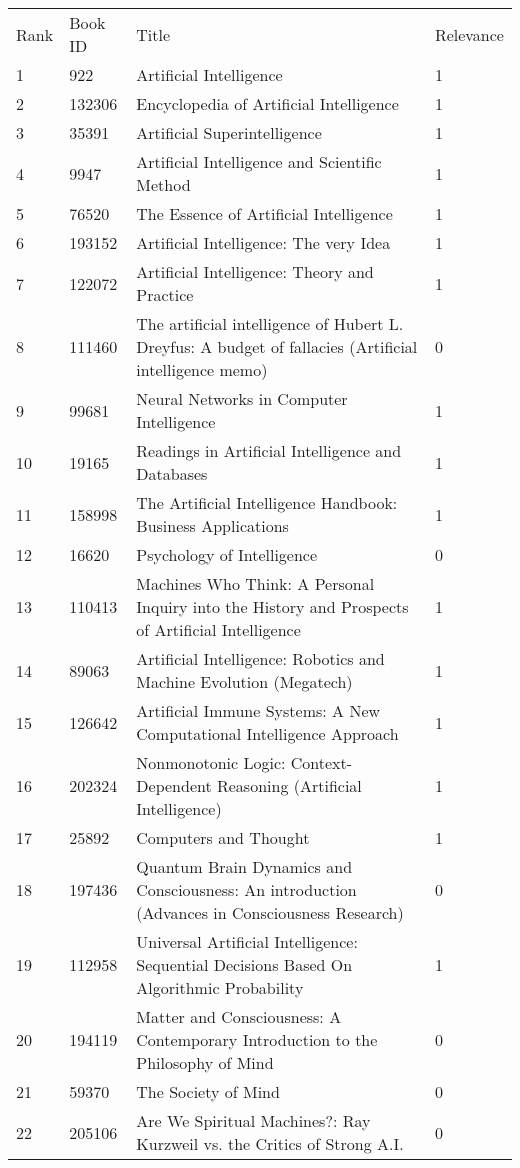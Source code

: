 \begin{tabular}{llll}
\toprule
\midrule
Rank & Book ID & Title & Relevance \\
1 & 922 & Artificial Intelligence & 1 \\
2 & 132306 & Encyclopedia of Artificial Intelligence & 1 \\
3 & 35391 & Artificial Superintelligence & 1 \\
4 & 9947 & Artificial Intelligence and Scientific Method & 1 \\
5 & 76520 & The Essence of Artificial Intelligence & 1 \\
6 & 193152 & Artificial Intelligence: The very Idea & 1 \\
7 & 122072 & Artificial Intelligence: Theory and Practice & 1 \\
8 & 111460 & The artificial intelligence of Hubert L. Dreyfus: A budget of fallacies (Artificial intelligence memo) & 0 \\
9 & 99681 & Neural Networks in Computer Intelligence & 1 \\
10 & 19165 & Readings in Artificial Intelligence and Databases & 1 \\
11 & 158998 & The Artificial Intelligence Handbook: Business Applications & 1 \\
12 & 16620 & Psychology of Intelligence & 0 \\
13 & 110413 & Machines Who Think: A Personal Inquiry into the History and Prospects of Artificial Intelligence & 1 \\
14 & 89063 & Artificial Intelligence: Robotics and Machine Evolution (Megatech) & 1 \\
15 & 126642 & Artificial Immune Systems: A New Computational Intelligence Approach & 1 \\
16 & 202324 & Nonmonotonic Logic: Context-Dependent Reasoning (Artificial Intelligence) & 1 \\
17 & 25892 & Computers and Thought & 1 \\
18 & 197436 & Quantum Brain Dynamics and Consciousness: An introduction (Advances in Consciousness Research) & 0 \\
19 & 112958 & Universal Artificial Intelligence: Sequential Decisions Based On Algorithmic Probability & 1 \\
20 & 194119 & Matter and Consciousness: A Contemporary Introduction to the Philosophy of Mind & 0 \\
21 & 59370 & The Society of Mind & 0 \\
22 & 205106 & Are We Spiritual Machines?: Ray Kurzweil vs. the Critics of Strong A.I. & 0 \\

\end{tabular}
